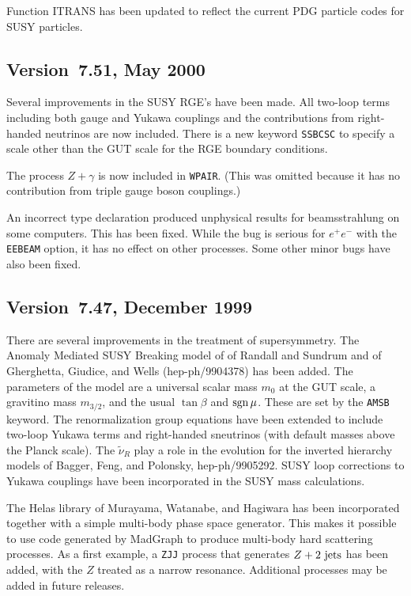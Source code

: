      Function ITRANS has been updated to reflect the current PDG
particle codes for SUSY particles.

\subsection{Version~7.51, May 2000}

        Several improvements in the SUSY RGE's have been made. All
two-loop terms including both gauge and Yukawa couplings and the
contributions from right-handed neutrinos are now included. There is a
new keyword \verb|SSBCSC| to specify a scale other than the GUT scale
for the RGE boundary conditions.

        The process $Z+\gamma$ is now included in \verb|WPAIR|. (This
was omitted because it has no contribution from triple gauge boson
couplings.)

        An incorrect type declaration produced unphysical results for
beamsstrahlung on some computers. This has been fixed. While the bug is
serious for $e^+e^-$ with the \verb|EEBEAM| option, it has no effect on
other processes. Some other minor bugs have also been fixed.

\subsection{Version~7.47, December 1999}

        There are several improvements in the treatment of
supersymmetry. The Anomaly Mediated SUSY Breaking model of of Randall
and Sundrum and of Gherghetta, Giudice, and Wells (hep-ph/9904378) has
been added. The parameters of the model are a universal scalar mass
$m_0$ at the GUT scale, a gravitino mass $m_{3/2}$, and the usual
$\tan\beta$ and $\mathop{\rm sgn}\mu$. These are set by the \verb|AMSB| keyword. The
renormalization group equations have been extended to include two-loop
Yukawa terms and right-handed sneutrinos (with default masses above the
Planck scale). The $\tilde\nu_R$ play a role in the evolution for the
inverted hierarchy models of Bagger, Feng, and Polonsky, hep-ph/9905292.
SUSY loop corrections to Yukawa couplings have been incorporated in the
SUSY mass calculations.

        The Helas library of Murayama, Watanabe, and Hagiwara has been
incorporated together with a simple multi-body phase space generator.
This makes it possible to use code generated by MadGraph to produce
multi-body hard scattering processes. As a first example, a \verb|ZJJ|
process that generates $Z + \hbox{2 jets}$ has been added, with the $Z$
treated as a narrow resonance. Additional processes may be added in
future releases.

